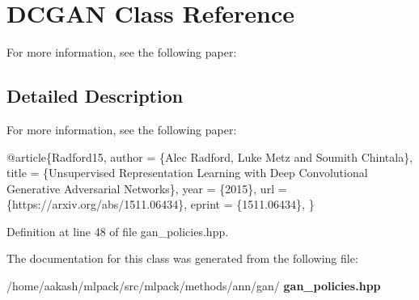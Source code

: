 \section{D\+C\+G\+AN Class Reference}
\label{classmlpack_1_1ann_1_1DCGAN}


For more information, see the following paper\+:  




\subsection{Detailed Description}
For more information, see the following paper\+: 


\begin{DoxyCode}
@article\{Radford15,
  author    = \{Alec Radford, Luke Metz and Soumith Chintala\},
  title     = \{Unsupervised Representation Learning with Deep Convolutional
               Generative Adversarial Networks\},
  year      = \{2015\},
  url       = \{https:\textcolor{comment}{//arxiv.org/abs/1511.06434\},}
  eprint    = \{1511.06434\},
\}
\end{DoxyCode}
 

Definition at line 48 of file gan\+\_\+policies.\+hpp.



The documentation for this class was generated from the following file\+:\begin{DoxyCompactItemize}
\item 
/home/aakash/mlpack/src/mlpack/methods/ann/gan/\textbf{ gan\+\_\+policies.\+hpp}\end{DoxyCompactItemize}
